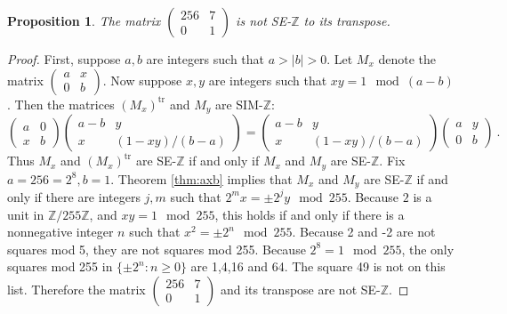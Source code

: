 \documentclass{amsart}
\newtheorem{prop}[equation]{Proposition}
\theoremstyle{definition}
\theoremstyle{definition}
\newcommand{\Z}{\mathbb Z}
\numberwithin{equation}{subsection}
\begin{document}
\begin{prop} \label{transposeexerciseproof}
The matrix
$\begin{pmatrix} 256 & 7\\ 0 &1 \end{pmatrix}$ is not SE-$\Z$ to its
transpose.
\end{prop}
\begin{proof}
First, suppose $a,b$ are integers such that $a> |b| >0$.  Let  $M_x$
denote the matrix $\left( \begin{smallmatrix} a & x \\ 0
    &b \end{smallmatrix} \right)$. Now suppose
$x,y$ are integers such that $xy = 1 \mod (a-b)$. Then
the matrices $(M_x)^{\text{tr}}$ and $M_y$ are SIM-$\Z$:
\[
\begin{pmatrix} a&0 \\ x&b \end{pmatrix}
\begin{pmatrix} a-b&y \\ x&(1-xy)/(b-a) \end{pmatrix}
=
\begin{pmatrix} a-b&y \\ x&(1-xy)/(b-a) \end{pmatrix}
\begin{pmatrix} a&y \\ 0&b \end{pmatrix} \ .
\]
Thus $M_x$ and $(M_x)^{\text{tr}}$ are SE-$\Z$ if and only if
$M_x$ and $M_y$ are SE-$\Z$.
Fix $a=256=2^8, b=1$.  Theorem \ref{thm:axb} implies that
$M_x$ and $M_y$ are SE-$\Z$ if and only if
there are integers $j,m$ such that
$2^mx =  \pm 2^jy \mod 255$. Because $2$ is a unit in $\Z/255\Z$,
and $xy = 1 \mod 255$,
this holds if and only if there is a nonnegative integer $n$ such that
$x^2= \pm 2^n \mod 255$. Because 2 and -2 are not squares mod 5, they
are not squares mod 255. Because $2^8=1 \mod 255$, the only squares
mod 255 in $\{ \pm 2^n: n\geq 0\}$ are 1,4,16 and 64.
The square 49 is not on this list. Therefore the matrix
$\left( \begin{smallmatrix} 256 & 7 \\ 0
    &1 \end{smallmatrix} \right)$ and its transpose are not SE-$\Z$.
\end{proof}
\end{document}
